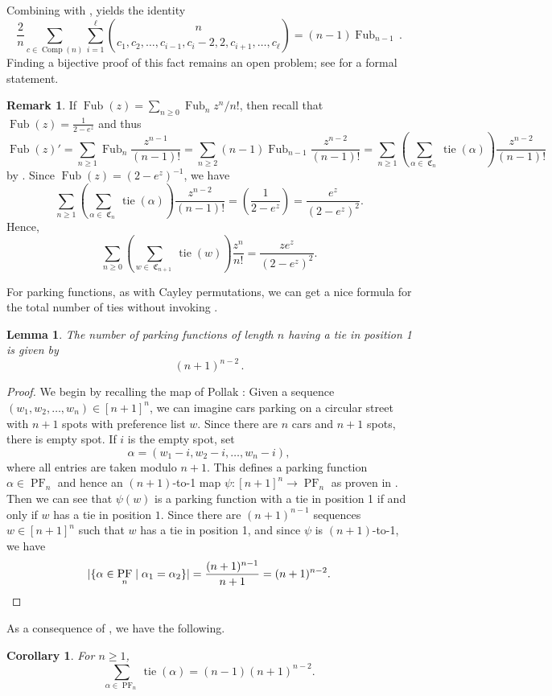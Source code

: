 \documentclass{amsart}
\newcommand{\eqpd}{\, .}
\DeclareMathOperator{\tie}{tie}
\DeclareMathOperator{\PF}{PF}
\DeclareMathOperator{\Comp}{Comp}
\DeclareMathOperator{\Fub}{Fub}
\DeclareMathOperator{\C}{\mathfrak{C}}
\newcommand{\lp}{\left(}
\newcommand{\rp}{\right)}
\newtheorem{corollary}[theorem]{Corollary}
\newtheorem{lemma}[theorem]{Lemma}
\theoremstyle{definition}
\newtheorem{remark}[theorem]{Remark}
\begin{document}
    Combining  with ,  yields the identity 
    \[\frac{2}{n}\sum_{c\in\Comp(n)}\sum_{i=1}^\ell \binom{n}{c_1,c_2,\dots,c_{i-1},c_i-2,2,c_{i+1},\dots,c_\ell}=(n-1)\Fub_{n-1}\eqpd \]
    Finding a bijective proof of this fact remains an open problem; see  for a formal statement.

    \begin{remark}        
    If $\Fub(z)=\sum_{n\geq 0}\Fub_{n}z^{n}/n!$, then recall that $\Fub(z)=\frac{1}{2-e^z}$ and thus
    \[\Fub(z)'=\sum_{n\geq 1}\Fub_{n}\frac{z^{n-1}}{(n-1)!}=\sum_{n\geq 2}(n-1)\Fub_{n-1}\frac{z^{n-2}}{(n-1)!}=\sum_{n\geq 1} \lp \sum_{\alpha\in\C_n}\tie(\alpha)\rp \frac{z^{n-2}}{(n-1)!}\]
    by . Since $\Fub(z)=(2-e^z)^{-1}$, we have
    \[\sum_{n\geq 1} \lp \sum_{\alpha\in\C_n}\tie(\alpha)\rp \frac{z^{n-2}}{(n-1)!}=\lp\frac
    {1}{2-e^z}\rp=\frac{e^z}{(2-e^z)^2}.\]
    Hence,
    \[\sum_{n\geq 0}\lp \sum_{w\in \C_{n+1}}\tie(w)\rp\frac{z^n}{n!}=\frac{ze^z}{(2-e^z)^2}.\]
    \end{remark} 
      
   For parking functions, as with Cayley permutations, we can get a nice formula for the total number of ties without invoking . 
    \begin{lemma}\label{prop:parktie}
    The number of parking functions of length $n$ having a tie in position 1 is given by \[(n+1)^{n-2} \eqpd \]
    \end{lemma}
   
        \begin{proof}
We begin by recalling the map of Pollak \cite{RIORDAN1969408}: Given a sequence $(w_1,w_2,\dots,w_n)\in [n+1]^n$, we can imagine cars parking on a circular street with $n+1$ spots with preference list $w$.  Since there are $n$ cars and $n+1$ spots, there is empty spot. If $i$ is the empty spot, set
    \[\alpha=(w_{1}-i,w_{2}-i,\dots,w_{n}-i),\]
    where all entries are taken modulo $n+1$. This defines a parking function $\alpha\in \PF_n$ and hence an $(n+1)$-to-1 map 
    $\psi:[n+1]^n\to \PF_n$ as proven in \cite{foata1974mappings}. Then we can see that $\psi(w)$ is a parking function with a tie in position 1 if and only if $w$ has a tie in position $1$. Since there are $(n+1)^{n-1}$ sequences $w\in [n+1]^n$ such that $w$ has a tie in position 1, and since $\psi$ is $(n+1)$-to-1, we have
    \[|\{\alpha\in \PF_n\mid \alpha_1=\alpha_2\}|=\frac{(n+1)^{n-1}}{n+1}=(n+1)^{n-2}.\qedhere\]
    \end{proof}
    As a consequence of , we have the following.
    \begin{corollary}\label{cor:ties in parking functions}For $n\geq 1$,
            \[\sum_{\alpha\in \PF_n}\tie(\alpha)=(n-1)(n+1)^{n-2}.\]
    \end{corollary}
    
\end{document}
